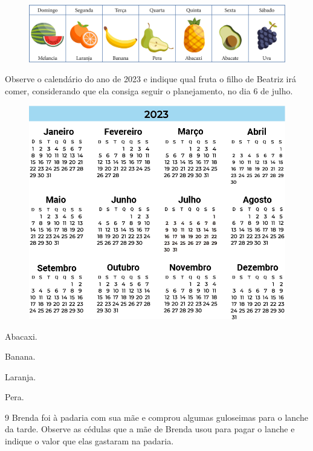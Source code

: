 \begin{figure}[htpb!]
\includegraphics[width=\textwidth]{./media/image143.png}
\end{figure}

\pagebreak

Observe o calendário do ano de 2023 e indique qual fruta o filho de
Beatriz irá comer, considerando que ela consiga seguir o planejamento, no dia 6 de julho.

\begin{figure}[htpb!]
\includegraphics[width=\textwidth]{./media/image144.png}
\end{figure}

\begin{escolha}
\item Abacaxi.

\item Banana.

\item Laranja.

\item Pera.
\end{escolha}

\pagebreak
\num{9} Brenda foi à padaria com sua mãe e comprou algumas guloseimas para o
lanche da tarde. Observe as cédulas que a mãe de Brenda usou para pagar
o lanche e indique o valor que elas gastaram na padaria.

